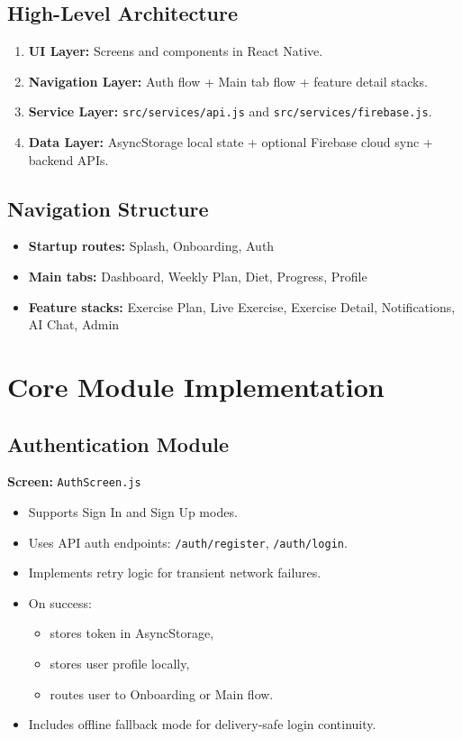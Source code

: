 \documentclass[12pt,a4paper]{article}
\begin{document}
\subsection{High-Level Architecture}
\begin{enumerate}[leftmargin=1.2cm]
  \item \textbf{UI Layer:} Screens and components in React Native.
  \item \textbf{Navigation Layer:} Auth flow + Main tab flow + feature detail stacks.
  \item \textbf{Service Layer:} \texttt{src/services/api.js} and \texttt{src/services/firebase.js}.
  \item \textbf{Data Layer:} AsyncStorage local state + optional Firebase cloud sync + backend APIs.
\end{enumerate}

\subsection{Navigation Structure}
\begin{itemize}[leftmargin=1.2cm]
  \item \textbf{Startup routes:} Splash, Onboarding, Auth
  \item \textbf{Main tabs:} Dashboard, Weekly Plan, Diet, Progress, Profile
  \item \textbf{Feature stacks:} Exercise Plan, Live Exercise, Exercise Detail, Notifications, AI Chat, Admin
\end{itemize}

\section{Core Module Implementation}
\subsection{Authentication Module}
\textbf{Screen:} \texttt{AuthScreen.js}
\begin{itemize}[leftmargin=1.2cm]
  \item Supports Sign In and Sign Up modes.
  \item Uses API auth endpoints: \texttt{/auth/register}, \texttt{/auth/login}.
  \item Implements retry logic for transient network failures.
  \item On success:
  \begin{itemize}
    \item stores token in AsyncStorage,
    \item stores user profile locally,
    \item routes user to Onboarding or Main flow.
  \end{itemize}
  \item Includes offline fallback mode for delivery-safe login continuity.
\end{itemize}
\end{document}
